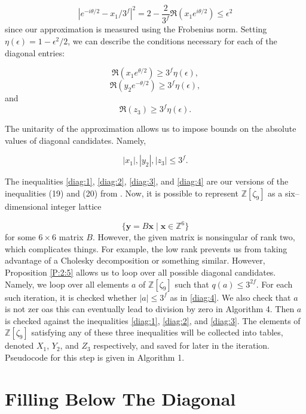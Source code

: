 \documentclass[12pt]{amsart}
\theoremstyle{definition}
\newcommand{\Z}{\mathbb{Z}}
\newcommand{\Zn}{\mathbb{Z}[\zeta_9]}
\begin{document}
	$$
	|e^{-i\theta/2} - x_1/3^f|^2 = 2 - \dfrac{2}{3^f} \Re(x_1e^{i\theta/2}) \leq \epsilon^2
	$$ 
	since our approximation is measured using the Frobenius norm. Setting $\eta(\epsilon) = 1 - \epsilon^2/2$, we can describe the conditions necessary for each of the diagonal entries:
	
	\begin{equation}\label{diag:1}
		\Re(x_1e^{\theta/2}) \geq 3^f\eta(\epsilon),
	\end{equation}
	\begin{equation}\label{diag:2}
		\Re(y_2e^{-\theta/2}) \geq 3^f\eta(\epsilon),
	\end{equation} and
	\begin{equation}\label{diag:3}
		\Re(z_3) \geq 3^f\eta(\epsilon).
	\end{equation}
	
	The unitarity of the approximation allows us to impose bounds on the absolute values of diagonal candidates. Namely,
	
	\begin{equation}\label{diag:4}
		|x_1|, |y_2|, |z_3| \leq 3^f.
	\end{equation}
	
	The inequalities \eqref{diag:1}, \eqref{diag:2}, \eqref{diag:3}, and \eqref{diag:4} are our versions of the inequalities (19) and (20) from \cite{Gust}. Now, it is possible to represent $\Zn$ as a six--dimensional integer lattice
	
	$$
	\{\mathbf{y} = B\mathbf{x} \; | \; \mathbf{x}\in \Z^6\}
	$$
	for some $6 \times 6$ matrix $B$. However, the given matrix is nonsingular of rank two, which complicates things. For example, the low rank prevents us from taking advantage of a Cholesky decomposition or something similar. However, Proposition \ref{P:2:5} allows us to loop over all possible diagonal candidates. Namely, we loop over all elements $a$ of $\Zn$ such that $q(a) \leq 3^{2f}$. For each such iteration, it is checked whether $|a| \leq 3^f$ as in \eqref{diag:4}. We also check that $a$ is not zer oas this can eventually lead to division by zero in Algorithm 4. Then $a$ is checked against the inequalities \eqref{diag:1}, \eqref{diag:2}, and \eqref{diag:3}. The elements of $\Zn$ satisfying any of these three inequalities will be collected into tables, denoted $X_1$, $Y_2$, and $Z_3$ respectively, and saved for later in the iteration. Pseudocode for this step is given in Algorithm 1.
	

	\section{Filling Below The Diagonal}
	
\end{document}
